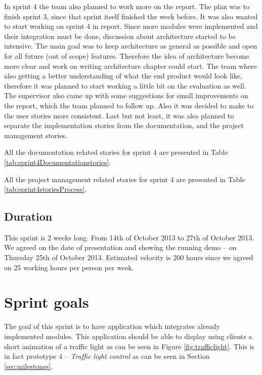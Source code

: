 In sprint 4 the team also planned to work more on the report. 
The plan was to finish sprint 3, since that sprint itself finished the week before. 
It was also wanted to start working on sprint 4 in report.
Since more modules were implemented and their integration must be done, discussion about architecture started to be intensive.
The main goal was to keep architecture as general as possible and open for all future (out of scope) features.
Therefore the idea of architecture become more clear and work on writing architecture chapter could start.
The team where also getting a better understanding of what the end product would look like, therefore it was planned to start working a little bit on the evaluation as well. 
The supervisor also came up with some suggestions for small improvements on the report, which the team planned to follow up.
Also it was decided to make to the user stories more consistent. 
Last but not least, it was also planned to separate the implementation stories from the documentation, and the project management stories.

All the documentation related stories for sprint 4 are presented in Table \ref{tab:sprint4Documentationstories}.


All the project management related stories for sprint 4 are presented in Table \ref{tab:sprint4storiesProcess}.



\subsection{Duration}
This sprint is 2 weeks long. From 14th of October 2013 to 27th of October 2013. 
We agreed on the date of presentation and showing the running demo -- on Thursday 25th of October 2013.
Estimated velocity is 200 hours since we agreed on 25 working hours per person per week.

\section{Sprint goals}
\label{sec:sprint4goal}
The goal of this sprint is to have application which integrates already implemented modules.
This application should be able to display using clients a short animation of a traffic light as can be seen in Figure \ref{fig:trafficlight}.
This is in fact prototype 4 -- \emph{Traffic light control} as can be seen in Section \ref{sec:milestones}.

